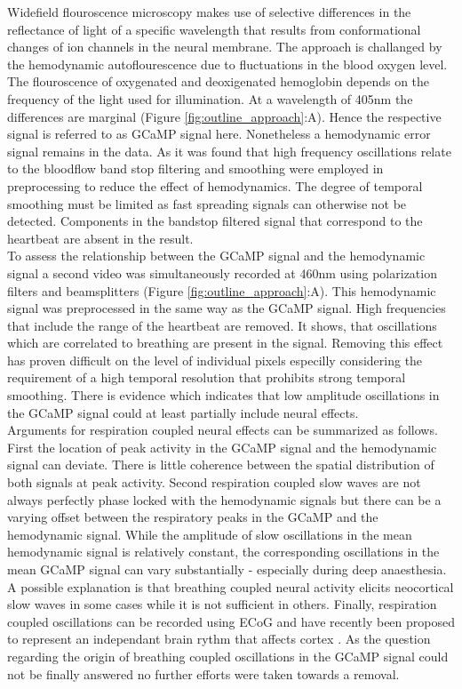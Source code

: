 Widefield flouroscence microscopy makes use of selective differences in the reflectance of light of a specific wavelength that results from conformational changes of ion channels in the neural membrane. The approach is challanged by the hemodynamic autoflourescence due to fluctuations in the blood oxygen level. The flouroscence of oxygenated and deoxigenated hemoglobin depends on the frequency of the light used for illumination. At a wavelength of 405nm the differences are marginal (Figure \ref{fig:outline_approach}:A). Hence the respective signal is referred to as GCaMP signal here. Nonetheless a hemodynamic error signal remains in the data. As it was found that high frequency oscillations relate to the bloodflow band stop filtering and smoothing were employed in preprocessing to reduce the effect of hemodynamics. The degree of temporal smoothing must be limited as fast spreading signals can otherwise not be detected. Components in the bandstop filtered signal that correspond to the heartbeat are absent in the result.\\
To assess the relationship between the GCaMP signal and the hemodynamic signal a second video was simultaneously recorded at 460nm using polarization filters and beamsplitters (Figure \ref{fig:outline_approach}:A). This hemodynamic signal was preprocessed in the same way as the GCaMP signal. High frequencies that include the range of the heartbeat are removed. It shows, that oscillations which are correlated to breathing are present in the signal. Removing this effect has proven difficult on the level of individual pixels especilly considering the requirement of a high temporal resolution that prohibits strong temporal smoothing. There is evidence which indicates that low amplitude oscillations in the GCaMP signal could at least partially include neural effects. \\
Arguments for respiration coupled neural effects can be summarized as follows. First the location of peak activity in the GCaMP signal and the hemodynamic signal can deviate. There is little coherence between the spatial distribution of both signals at peak activity. Second respiration coupled slow waves are not always perfectly phase locked with the hemodynamic signals but there can be a varying offset between the respiratory peaks in the GCaMP and the hemodynamic signal. While the amplitude of slow oscillations in the mean hemodynamic signal is relatively constant, the corresponding oscillations in the mean GCaMP signal can vary substantially - especially during deep anaesthesia. A possible explanation is that breathing coupled neural activity elicits neocortical slow waves in some cases while it is not sufficient in others. Finally, respiration coupled oscillations can be recorded using ECoG and have recently been proposed to represent an independant brain rythm that affects cortex \parencite{tort2018parallel}. As the question regarding the origin of breathing coupled oscillations in the GCaMP signal could not be finally answered no further efforts were taken towards a removal.\\
